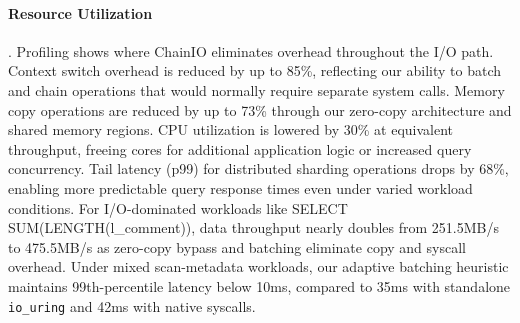 \documentclass[sigconf,10pt]{acmart}
\newcommand{\sys}{ChainIO\xspace}
\begin{document}
\paragraph{Resource Utilization}. Profiling shows where \sys eliminates overhead throughout the I/O path. Context switch overhead is reduced by up to 85\%, reflecting our ability to batch and chain operations that would normally require separate system calls. Memory copy operations are reduced by up to 73\% through our zero-copy architecture and shared memory regions. CPU utilization is lowered by 30\% at equivalent throughput, freeing cores for additional application logic or increased query concurrency. Tail latency (p99) for distributed sharding operations drops by 68\%, enabling more predictable query response times even under varied workload conditions. For I/O-dominated workloads like SELECT SUM(LENGTH(l\_comment)), data throughput nearly doubles from 251.5MB/s to 475.5MB/s as zero-copy bypass and batching eliminate copy and syscall overhead. Under mixed scan-metadata workloads, our adaptive batching heuristic maintains 99th-percentile latency below 10ms, compared to 35ms with standalone \texttt{io\_uring} and 42ms with native syscalls.



\end{document}

